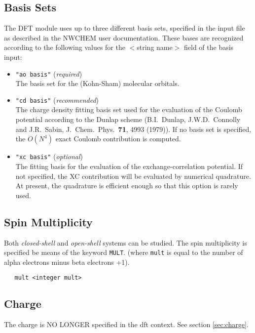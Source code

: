 \label{sec:dft}

\subsection{Basis Sets}
The DFT module uses up to three different basis sets, specified 
in the input file as described in the NWCHEM user documentation.
These bases are recognized according to
the following values for the $<$string name$>$ field of the basis input:
\begin{itemize}
\item {\tt "ao basis"}  ({\sl required}) \\
   The basis set for the (Kohn-Sham) molecular orbitals.
\item {\tt "cd basis"} ({\sl recommended}) \\
   The charge density fitting basis set used for the
  evaluation of the Coulomb potential according to the Dunlap scheme
  (B.I.~Dunlap, J.W.D.~Connolly and J.R.~Sabin, J.~Chem.~Phys.~{\bf 71},
  4993 (1979)).  If no basis set is specified,
  the $O(N^4)$ exact Coulomb contribution is computed. 
\item {\tt "xc basis"}  ({\sl optional})\\
   The fitting basis for the evaluation of the
  exchange-correlation potential.  If not specified,
  the XC contribution will be evaluated by numerical quadrature.
  At present, the quadrature is efficient enough so that this option
  is rarely used.
\end{itemize}

\subsection{Spin Multiplicity}

Both {\sl closed-shell} and {\sl open-shell} systems can be studied. 
The spin multiplicity is specified be means of the keyword {\tt MULT}.
(where \verb+mult+ is equal to the number of alpha electrons minus
beta electrons +1).

\begin{verbatim}
   mult <integer mult> 
\end{verbatim}

\subsection{Charge}

The charge is NO LONGER specified in the dft context.  See section 
\ref{sec:charge}.

